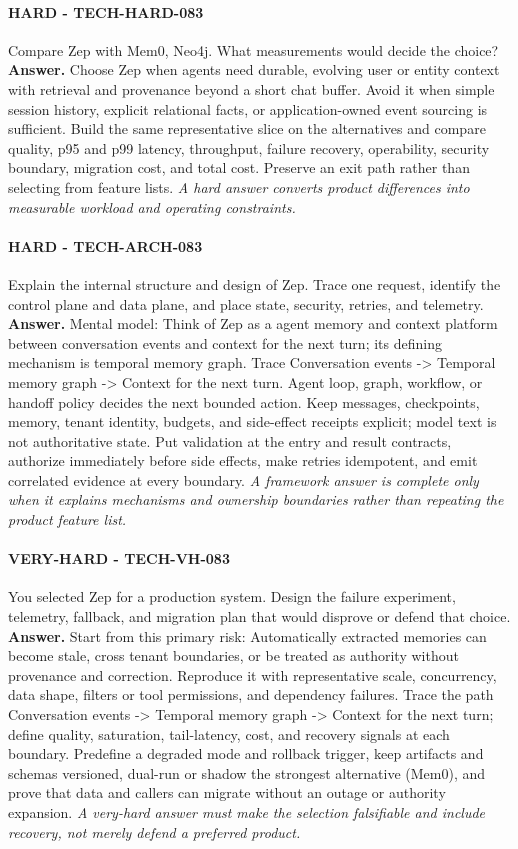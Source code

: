 \paragraph{HARD - TECH-HARD-083} Compare Zep with Mem0, Neo4j. What measurements would decide the choice?
\textbf{Answer.} Choose Zep when agents need durable, evolving user or entity context with retrieval and provenance beyond a short chat buffer. Avoid it when simple session history, explicit relational facts, or application-owned event sourcing is sufficient. Build the same representative slice on the alternatives and compare quality, p95 and p99 latency, throughput, failure recovery, operability, security boundary, migration cost, and total cost. Preserve an exit path rather than selecting from feature lists.
\textit{A hard answer converts product differences into measurable workload and operating constraints.}
\paragraph{HARD - TECH-ARCH-083} Explain the internal structure and design of Zep. Trace one request, identify the control plane and data plane, and place state, security, retries, and telemetry.
\textbf{Answer.} Mental model: Think of Zep as a agent memory and context platform between conversation events and context for the next turn; its defining mechanism is temporal memory graph. Trace Conversation events -> Temporal memory graph -> Context for the next turn. Agent loop, graph, workflow, or handoff policy decides the next bounded action. Keep messages, checkpoints, memory, tenant identity, budgets, and side-effect receipts explicit; model text is not authoritative state. Put validation at the entry and result contracts, authorize immediately before side effects, make retries idempotent, and emit correlated evidence at every boundary.
\textit{A framework answer is complete only when it explains mechanisms and ownership boundaries rather than repeating the product feature list.}
\paragraph{VERY-HARD - TECH-VH-083} You selected Zep for a production system. Design the failure experiment, telemetry, fallback, and migration plan that would disprove or defend that choice.
\textbf{Answer.} Start from this primary risk: Automatically extracted memories can become stale, cross tenant boundaries, or be treated as authority without provenance and correction. Reproduce it with representative scale, concurrency, data shape, filters or tool permissions, and dependency failures. Trace the path Conversation events -> Temporal memory graph -> Context for the next turn; define quality, saturation, tail-latency, cost, and recovery signals at each boundary. Predefine a degraded mode and rollback trigger, keep artifacts and schemas versioned, dual-run or shadow the strongest alternative (Mem0), and prove that data and callers can migrate without an outage or authority expansion.
\textit{A very-hard answer must make the selection falsifiable and include recovery, not merely defend a preferred product.}
